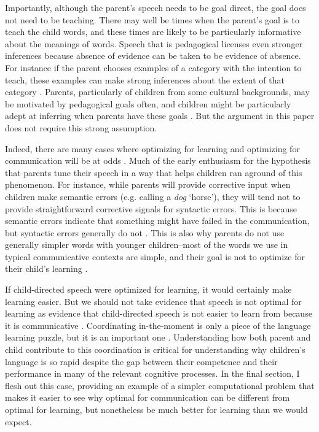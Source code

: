 \documentclass[review]{elsarticle}
\begin{document}
Importantly, although the parent's speech needs to be goal direct, the goal does not need to be teaching. There may well be times when the parent's goal is to teach the child words, and these times are likely to be particularly informative about the meanings of words. Speech that is pedagogical licenses even stronger inferences because absence of evidence can be taken to be evidence of absence. For instance if the parent chooses examples of a category with the intention to teach, these examples can make strong inferences about the extent of that category \citep[e.g. a parent would be unlikely to choose three peppers to teach the child \emph{vegetable};][]{xu2007}. Parents, particularly of children from some cultural backgrounds, may be motivated by pedagogical goals often, and children might be particularly adept at inferring when parents have these goals \citep{csibra2009}. But the argument in this paper does not require this strong assumption.

Indeed, there are many cases where optimizing for learning and optimizing for communication will be at odds \citep{kirby2015}. Much of the early enthusiasm for the hypothesis that parents tune their speech in a way that helps children ran aground of this phenomenon. For instance, while parents will provide corrective input when children make semantic errors (e.g. calling a \emph{dog} `horse'), they will tend not to provide straightforward corrective signals for syntactic errors. This is because semantic errors indicate that something might have failed in the communication, but syntactic errors generally do not \citep{newport1977}. This is also why parents do not use generally simpler words with younger children--most of the words we use in typical communicative contexts are simple, and their goal is not to optimize for their child's learning \citep{hayes1988,yurovsky2016a}. 

If child-directed speech were optimized for learning, it would certainly make learning easier. But we should not take evidence that speech is not optimal for learning as evidence that child-directed speech is not easier to learn from because it is communicative \citep{eaves-jr2016,mcmurray2013}. Coordinating in-the-moment is only a piece of the language learning puzzle, but it is an important one \citep{tomasello2000}. Understanding how both parent and child contribute to this coordination is critical for understanding why children's language is so rapid despite the gap between their competence and their performance in many of the relevant cognitive processes. In the final section, I flesh out this case, providing an example of a simpler computational problem that makes it easier to see why optimal for communication can be different from optimal for learning, but nonetheless be much better for learning than we would expect.
\end{document}

